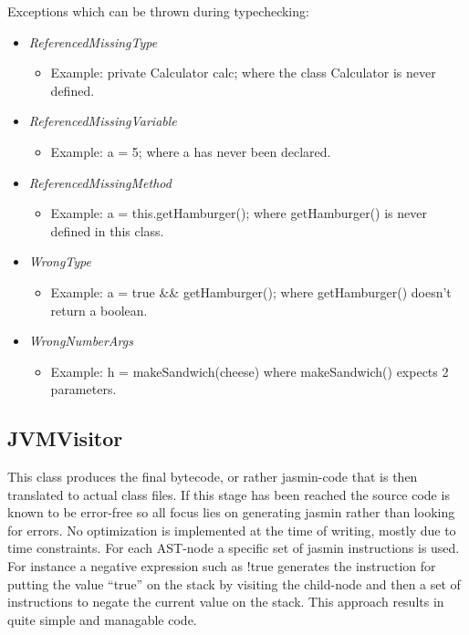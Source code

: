 \documentclass[paper=a4, fontsize=11pt]{scrartcl} %
\numberwithin{equation}{section} %
\numberwithin{figure}{section} %
\numberwithin{table}{section} %
\begin{document}
Exceptions which can be thrown during typechecking:
\begin{itemize}
  \item{\emph{ReferencedMissingType}}
  \begin{itemize}
    \item{Example: private Calculator calc; where the class Calculator is never defined.}
  \end{itemize}
  \item{\emph{ReferencedMissingVariable}}
  \begin{itemize}
    \item{Example: a = 5; where a has never been declared.}
  \end{itemize}
  \item{\emph{ReferencedMissingMethod}}
  \begin{itemize}
    \item{Example: a = this.getHamburger(); where getHamburger() is never defined in this class.}
  \end{itemize}
  \item{\emph{WrongType}}
  \begin{itemize}
    \item{Example: a = true \&\& getHamburger(); where getHamburger() doesn’t return a boolean.}
  \end{itemize}
  \item{\emph{WrongNumberArgs}}
  \begin{itemize}
    \item{Example: h = makeSandwich(cheese) where makeSandwich() expects 2 parameters. }
  \end{itemize}
\end{itemize}

\subsection*{JVMVisitor}
This class produces the final bytecode, or rather jasmin-code that is then translated to actual class files. If this stage has been reached the source code is known to be error-free so all focus lies on generating jasmin rather than looking for errors. No optimization is implemented at the time of writing, mostly due to time constraints. For each AST-node a specific set of jasmin instructions is used. For instance a negative expression such as !true generates the instruction for putting the value “true” on the stack by visiting the child-node and then a set of instructions to negate the current value on the stack. This approach results in quite simple and managable code.
\end{document}
